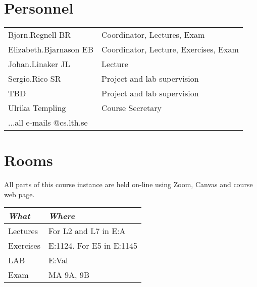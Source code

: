 \section{Personnel}
\begin{flushleft}
	\setlength{\tabcolsep}{0pt}
	\begin{tabular}{p{} p{}}
		Bjorn.Regnell BR & Coordinator, Lectures, Exam \\
		Elizabeth.Bjarnason EB & Coordinator, Lecture, Exercises, Exam \\
		Johan.Linaker JL & Lecture \\
		Sergio.Rico SR & Project and lab supervision \\
		TBD & Project and lab supervision \\
		Ulrika Templing & Course Secretary \\
		...all e-mails @cs.lth.se
	\end{tabular}
\end{flushleft}

\section{Rooms}
All parts of this course instance are held on-line using Zoom, Canvas and course web page.
\begin{flushleft}
\small
\begin{tabular}{l | l } 
{\it What} & {\it Where} \\
\hline
Lectures & For L2 and L7 in E:A \\
Exercises & E:1124. For E5 in E:1145 \\
LAB& E:Val\\
Exam & MA 9A, 9B \\
\end{tabular}
\end{flushleft}
